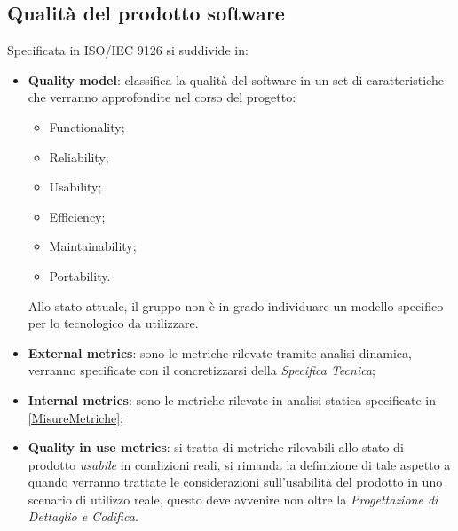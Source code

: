 	\subsection{Qualità del prodotto software}
	Specificata in ISO/IEC 9126 si suddivide in:
	\begin{itemize}
		\item \textbf{Quality model}: classifica la qualità del software in un set di caratteristiche che verranno approfondite nel corso del progetto:
			\begin{itemize}
				\item Functionality;
				\item Reliability;
				\item Usability;
				\item Efficiency;
				\item Maintainability;
				\item Portability.
			\end{itemize}
			Allo stato attuale, il gruppo non è in grado individuare un modello specifico per lo  tecnologico da utilizzare.
		\item \textbf{External metrics}: sono le metriche rilevate tramite analisi dinamica, verranno specificate con il concretizzarsi della \emph{Specifica Tecnica};
		\item \textbf{Internal metrics}: sono le metriche rilevate in analisi statica specificate in \ref{MisureMetriche};
		\item \textbf{Quality in use metrics}: si tratta di metriche rilevabili allo stato di prodotto \emph{usabile} in condizioni reali, si rimanda la definizione di tale aspetto a quando verranno trattate le considerazioni sull'usabilità del prodotto in uno scenario di utilizzo reale, questo deve avvenire non oltre la \emph{Progettazione di Dettaglio e Codifica}.
	\end{itemize}

